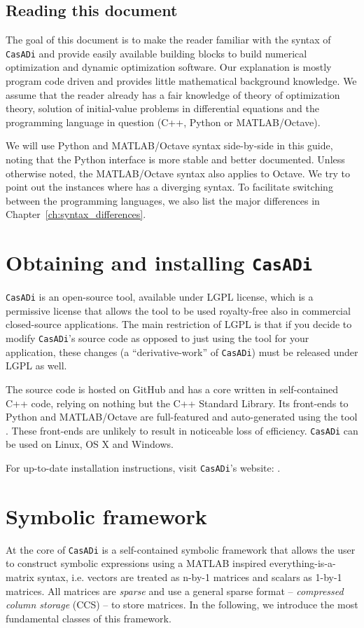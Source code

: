 \documentclass[a4paper,12pt]{book}
\newcommand{\CasADi}{\texttt{CasADi}\xspace}
\begin{document}
\section{Reading this document}
The goal of this document is to make the reader familiar with the syntax of \CasADi and provide easily available building blocks to build numerical optimization and dynamic optimization software. Our explanation is mostly program code driven and provides little mathematical background knowledge. We assume that the reader already has a fair knowledge of theory of optimization theory, solution of initial-value problems in differential equations and the programming language in question (C++, Python or MATLAB/Octave).

We will use Python and MATLAB/Octave syntax side-by-side in this guide, noting that the Python interface is more stable and better documented. Unless otherwise noted, the MATLAB/Octave syntax also applies to Octave. We try to point out the instances where has a diverging syntax. To facilitate switching between the programming languages, we also list the major differences in Chapter~\ref{ch:syntax_differences}.

\chapter{Obtaining and installing \CasADi}
\CasADi is an open-source tool, available under LGPL license, which is a permissive license that allows the tool to be used royalty-free also in commercial closed-source applications. The main restriction of LGPL is that if you decide to modify \CasADi's source code as opposed to just using the tool for your application, these changes (a ``derivative-work'' of \CasADi) must be released under LGPL as well.

The source code is hosted on GitHub and has a core written in self-contained C++ code, relying on nothing but the C++ Standard Library. Its front-ends to Python and MATLAB/Octave are full-featured and auto-generated using the tool . These front-ends are unlikely to result in noticeable loss of efficiency. \CasADi can be used on Linux, OS X and Windows.

For up-to-date installation instructions, visit \CasADi's website: .

\chapter{Symbolic framework}
At the core of \CasADi is a self-contained symbolic framework that allows the user to construct symbolic expressions using a MATLAB inspired everything-is-a-matrix syntax, i.e. vectors are treated as n-by-1 matrices and scalars as 1-by-1 matrices. All matrices are \emph{sparse} and use a general sparse format -- \emph{compressed column storage} (CCS) -- to store matrices. In the following, we introduce the most fundamental classes of this framework.
\end{document}

